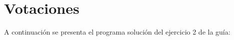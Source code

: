 \section{Votaciones}

  A continuación se presenta el programa solución
  del ejercicio 2 de la guía:
  
  